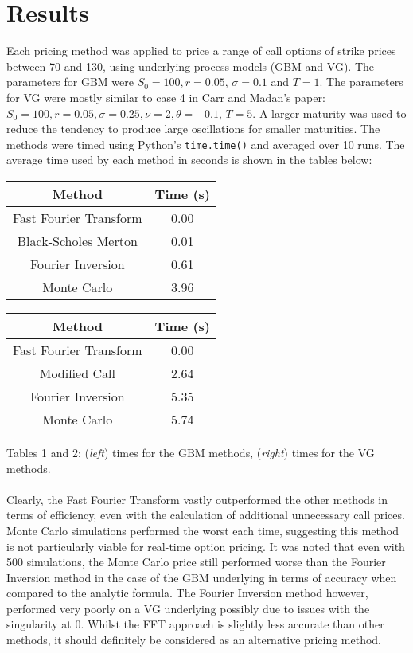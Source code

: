 \documentclass[11pt]{article}
\begin{document}
	\section{Results}
	Each pricing method was applied to price a range of call options of strike prices between 70 and 130, using underlying process models (GBM and VG). The parameters for GBM were \( S_0 = 100, r = 0.05 \), \( \sigma = 0.1 \) and \( T = 1 \). The parameters for VG were mostly similar to case 4 in Carr and Madan's paper: \( S_0 = 100, r = 0.05, \sigma = 0.25, \nu = 2, \theta = -0.1 \), \( T = 5 \). A larger maturity was used to reduce the tendency to produce large oscillations for smaller maturities. The methods were timed using Python's \colorbox{gray!25}{\texttt{time.time()}} and averaged over 10 runs. The average time used by each method in seconds is shown in the tables below:
	\begin{center}
		\begin{tabular}{cc}
			\hline
			\hline
			\textbf{Method} & \textbf{Time (s)}\\
			\hline
			Fast Fourier Transform & 0.00\\
			Black-Scholes Merton & 0.01 \\
			Fourier Inversion & 0.61 \\
			Monte Carlo & 3.96 \\
			\hline
			\end{tabular}\hspace{1cm}
		\begin{tabular}{cc}
			\hline
			\hline
			\textbf{Method} & \textbf{Time (s)}\\
			\hline
			Fast Fourier Transform & 0.00\\
			Modified Call & 2.64 \\
			Fourier Inversion & 5.35 \\
			Monte Carlo & 5.74 \\
			\hline
		\end{tabular}
	\end{center}
	Tables 1 and 2: (\textit{left}) times for the GBM methods, (\textit{right}) times for the VG methods.\\\\
	Clearly, the Fast Fourier Transform vastly outperformed the other methods in terms of efficiency, even with the calculation of additional unnecessary call prices. Monte Carlo simulations performed the worst each time, suggesting this method is not particularly viable for real-time option pricing. It was noted that even with 500 simulations, the Monte Carlo price still performed worse than the Fourier Inversion method in the case of the GBM underlying in terms of accuracy when compared to the analytic formula. The Fourier Inversion method however, performed very poorly on a VG underlying possibly due to issues with the singularity at 0. Whilst the FFT approach is slightly less accurate than other methods, it should definitely be considered as an alternative pricing method. 
		
\end{document}
